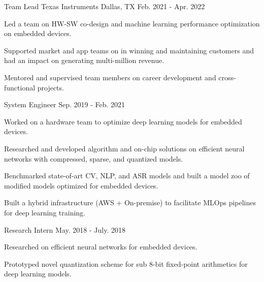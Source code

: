 \begin{cventries}
	\cventry
		{Team Lead} %
		{Texas Instruments} %
		{Dallas, TX} %
		{Feb. 2021 - Apr. 2022} %
		{
			\begin{cvitems} %
				\item {Led a team on HW-SW co-design and machine learning performance optimization on embedded devices.}
				\item {Supported market and app teams on in winning and maintaining customers and had an impact on generating multi-million revenue.}
				\item {Mentored and supervised team members on career development and cross-functional projects.}
			\end{cvitems}
		}

	\cventry
		{System Engineer} %
		{} %
		{} %
		{Sep. 2019 - Feb. 2021} %
		{
			\begin{cvitems} %
				\item {Worked on a hardware team to optimize deep learning models for embedded devices.}
				\item {Researched and developed algorithm and on-chip solutions on efficient neural networks with compressed, sparse, and quantized models.}
				\item {Benchmarked state-of-art CV, NLP, and ASR models and built a model zoo of modified models optimized for embedded devices.}
				\item {Built a hybrid infrastructure (AWS + On-premise) to facilitate MLOps pipelines for deep learning training.}
			\end{cvitems}
		}
	
	\cventry
		{Research Intern} %
		{} %
		{} %
		{May. 2018 - July. 2018} %
		{
			\begin{cvitems} %
				\item {Researched on efficient neural networks for embedded devices.}
				\item {Prototyped novel quantization scheme for sub 8-bit fixed-point arithmetics for deep learning models.}
			\end{cvitems}
		}


\end{cventries}

